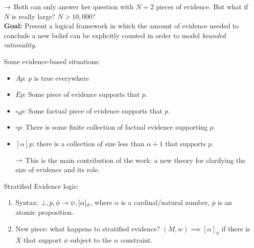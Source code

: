 $\rightarrow$ Both can only answer her question with $N = 2$ pieces of evidence. But what if $N$ is really large? $N > 10,000$? \\

{\bf Goal:} Present a logical framework in which the amount of evidence needed to conclude a new belief can be explicitly counted in order to model {\it bounded rationality}. \\


Some evidence-based situations:
\begin{itemize}
    \item $Ap$: $p$ is true everywhere
    \item $Ep$: Some piece of evidence supports that $p$.
    \item $\square_0 p$: Some factual piece of evidence supports that $p$.
    \item $\square p$: There is some finite collection of factual evidence supporting $p$.
    \item $[\alpha]p$: there is a collection of size less than $\alpha + 1$ that supports $p$.
    
    $\rightarrow$ This is the main contribution of the work: a new theory for clarifying the size of evidence and its role.
\end{itemize}

\newpage
{}

Stratified Evidence logic:
\begin{enumerate}
    \item Syntax: $\perp, p, \phi \rightarrow \psi, [\alpha]_\phi$, where $\alpha$ is a cardinal/natural number, $p$ is an atomic proposition.
    \item New piece: what happens to stratified evidence? $(M, w) \implies [\alpha]_\phi$ if there is $X$ that support $\phi$ subject to the $\alpha$ constraint.
\end{enumerate}

